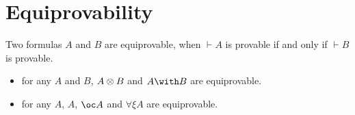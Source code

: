 \section{Equiprovability}\label{equiprovability}

Two formulas \(A\) and \(B\) are equiprovable, when \(\vdash A\) is
provable if and only if \(\vdash B\) is provable.

\begin{itemize}
\tightlist
\item
  for any \(A\) and \(B\), \(A\otimes B\) and \(A\with B\) are
  equiprovable.
\item
  for any \(A\), \(A\), \(\oc A\) and \(\forall\xi A\) are equiprovable.
\end{itemize}

